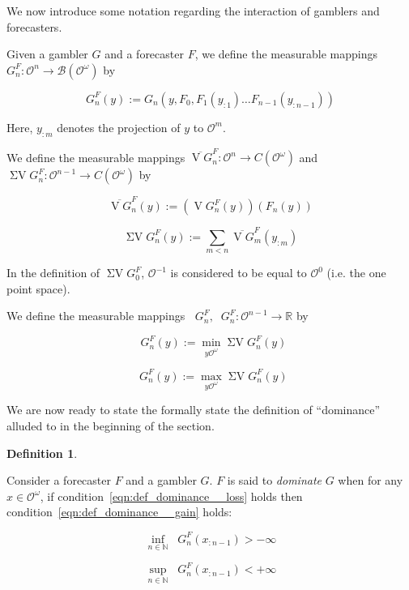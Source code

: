 \documentclass[11pt]{article}
\theoremstyle{definition}
\newtheorem{definition}{Definition}%
\theoremstyle{plain}
\newcommand{\Nats}{\mathbb{N}}
\newcommand{\Reals}{\mathbb{R}}
\newcommand{\Ob}{\mathcal{O}}
\newcommand{\OO}{\Ob^\omega}
\newcommand{\Gm}{\mathcal{B}}
\newcommand{\GMO}{\Gm(\OO)}
\newcommand{\CO}{C(\OO)}
\DeclareMathOperator{\V}{V}
\DeclareMathOperator{\SV}{\Sigma V}
\DeclareMathOperator{\SVM}{\Sigma V_{\min}}
\DeclareMathOperator{\SVX}{\Sigma V_{\max}}
\begin{document}
We now introduce some notation regarding the interaction of gamblers and forecasters. 

Given a gambler $G$ and a forecaster $F$, we define the measurable mappings $G^F_n: \Ob^n \rightarrow \GMO$ by

\begin{equation}
\label{eqn:GF}
G^F_n\left(y\right):=G_n\left(y,F_0,F_1\left(y_{:1}\right) \ldots F_{n-1}\left(y_{:n-1}\right)\right)
\end{equation}

Here, $y_{:m}$ denotes the projection of $y$ to $\Ob^m$.

We define the measurable mappings $\overline{\V G}^F_n: \Ob^n \rightarrow \CO$ and $\SV G^F_n: \Ob^{n-1} \rightarrow \CO$ by

\begin{equation}
\overline{\V G}^F_n\left(y\right):=\left(\V G^F_n\left(y\right)\right)\left(F_n\left(y\right)\right)
\end{equation}

\begin{equation}
\SV G^F_n\left(y\right) := \sum_{m < n} \overline{\V G}^F_m\left(y_{:m}\right)
\end{equation}

In the definition of $\SV G^F_0$, $\Ob^{-1}$ is considered to be equal to $\Ob^0$ (i.e. the one point space).

We define the measurable mappings $\SVM G^F_n, \SVX G^F_n: \Ob^{n-1} \rightarrow \Reals$ by

\begin{equation}
\SVM G^F_n\left(y\right):=\min_{y\OO} \SV G^F_n(y)
\end{equation}

\begin{equation}
\SVX G^F_n\left(y\right):=\max_{y\OO} \SV G^F_n(y)
\end{equation}

We are now ready to state the formally state the definition of \enquote{dominance} alluded to in the beginning of the section.

\begin{definition}
\label{def:dominance}

Consider a forecaster $F$ and a gambler $G$. $F$ is said to \emph{dominate} $G$ when for any $x \in \OO$, if condition~\ref{eqn:def_dominance__loss} holds then condition~\ref{eqn:def_dominance__gain} holds:

\begin{equation}
\label{eqn:def_dominance__loss}
\inf_{n \in \Nats} {\SVM G^F_{n}\left(x_{:n-1}\right)} > -\infty
\end{equation}

\begin{equation}
\label{eqn:def_dominance__gain}
\sup_{n \in \Nats} {\SVX G^F_{n}\left(x_{:n-1}\right)} < +\infty
\end{equation}

\end{definition}
\end{document}
